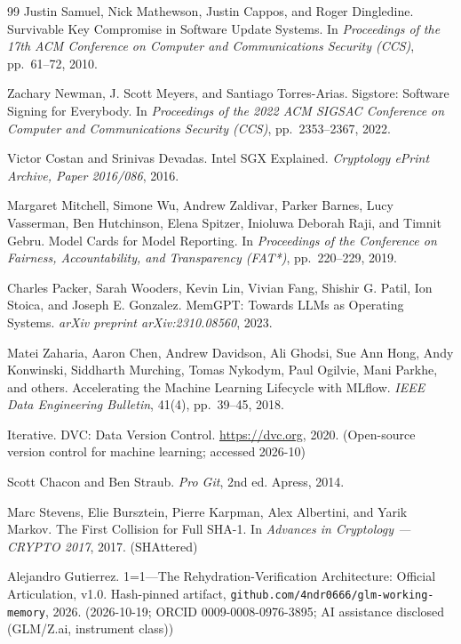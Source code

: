 \documentclass[11pt]{article}
\begin{document}
\begin{thebibliography}{99}
 Justin Samuel, Nick Mathewson, Justin Cappos, and Roger Dingledine. Survivable Key Compromise in Software Update Systems. In \emph{Proceedings of the 17th ACM Conference on Computer and Communications Security (CCS)}, pp.~61--72, 2010.

 Zachary Newman, J. Scott Meyers, and Santiago Torres-Arias. Sigstore: Software Signing for Everybody. In \emph{Proceedings of the 2022 ACM SIGSAC Conference on Computer and Communications Security (CCS)}, pp.~2353--2367, 2022.

 Victor Costan and Srinivas Devadas. Intel {SGX} Explained. \emph{Cryptology ePrint Archive, Paper 2016/086}, 2016.

 Margaret Mitchell, Simone Wu, Andrew Zaldivar, Parker Barnes, Lucy Vasserman, Ben Hutchinson, Elena Spitzer, Inioluwa Deborah Raji, and Timnit Gebru. Model Cards for Model Reporting. In \emph{Proceedings of the Conference on Fairness, Accountability, and Transparency (FAT*)}, pp.~220--229, 2019.

 Charles Packer, Sarah Wooders, Kevin Lin, Vivian Fang, Shishir G. Patil, Ion Stoica, and Joseph E. Gonzalez. {MemGPT}: Towards {LLM}s as Operating Systems. \emph{arXiv preprint arXiv:2310.08560}, 2023.

 Matei Zaharia, Aaron Chen, Andrew Davidson, Ali Ghodsi, Sue Ann Hong, Andy Konwinski, Siddharth Murching, Tomas Nykodym, Paul Ogilvie, Mani Parkhe, and others. Accelerating the Machine Learning Lifecycle with {MLflow}. \emph{IEEE Data Engineering Bulletin}, 41(4), pp.~39--45, 2018.

 Iterative. {DVC}: Data Version Control. \url{https://dvc.org}, 2020. (Open-source version control for machine learning; accessed 2026-10)

 Scott Chacon and Ben Straub. \emph{Pro Git}, 2nd ed. Apress, 2014.

 Marc Stevens, Elie Bursztein, Pierre Karpman, Alex Albertini, and Yarik Markov. The First Collision for Full {SHA-1}. In \emph{Advances in Cryptology --- CRYPTO 2017}, 2017. (SHAttered)

 Alejandro Gutierrez. 1=1---The Rehydration-Verification Architecture: Official Articulation, v1.0. Hash-pinned artifact, \nolinkurl{github.com/4ndr0666/glm-working-memory}, 2026. (2026-10-19; ORCID 0009-0008-0976-3895; AI assistance disclosed (GLM/Z.ai, instrument class))

\end{thebibliography}
\end{document}
